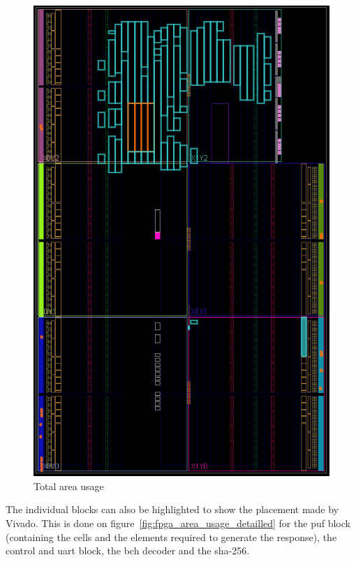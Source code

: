 \begin{figure}[H]
    \centering
    \includegraphics[width=0.65\linewidth]{images/overview_area_usage.png}
    \caption{Total area usage}
    \label{fig:overview_area_usage}
\end{figure}



The individual blocks can also be highlighted to show the placement made by Vivado. This is done on figure~\ref{fig:fpga_area_usage_detailled} for the \acrshort{puf} block (containing the cells and the elements required to generate the response), the control and \acrfull{uart} block, the \acrshort{bch} decoder and the \acrshort{sha}-256.

